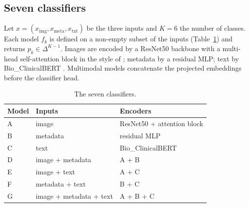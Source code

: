\documentclass[conference]{IEEEtran}
\begin{document}
\subsection{Seven classifiers}
Let $x=(x_{\mathrm{img}},x_{\mathrm{meta}},x_{\mathrm{txt}})$ be the three inputs and $K=6$ the number of classes. Each model $f_k$ is defined on a non-empty subset of the inputs (Table~\ref{tab:models}) and returns $p_k\in\Delta^{K-1}$. Images are encoded by a ResNet50 backbone \cite{he2016} with a multi-head self-attention block in the style of \cite{dosovitskiy2021}; metadata by a residual MLP; text by Bio\_ClinicalBERT \cite{alsentzer2019}. Multimodal models concatenate the projected embeddings before the classifier head.

\begin{table}[!t]
\caption{The seven classifiers.}
\label{tab:models}
\centering\footnotesize
\begin{tabular}{lll}
\toprule
Model & Inputs & Encoders \\
\midrule
A & image & ResNet50 + attention block \\
B & metadata & residual MLP \\
C & text & Bio\_ClinicalBERT \\
D & image + metadata & A + B \\
E & image + text & A + C \\
F & metadata + text & B + C \\
G & image + metadata + text & A + B + C \\
\bottomrule
\end{tabular}
\end{table}
\end{document}
